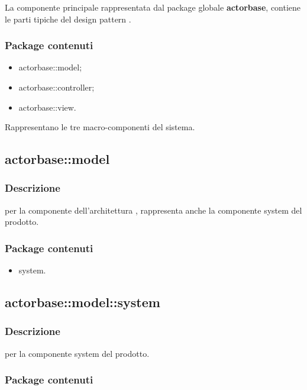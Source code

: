 \documentclass{scalatekids-article}
\begin{document}
La componente principale rappresentata dal package globale \textbf{actorbase},
contiene le parti tipiche del design pattern .

\subsubsection{Package contenuti}

\begin{itemize}
\item actorbase::model;
\item actorbase::controller;
\item actorbase::view.
\end{itemize}

Rappresentano le tre macro-componenti del sistema.

\subsection{actorbase::model}

\subsubsection{Descrizione}

 per la componente  dell'architettura , rappresenta anche la componente system del prodotto.

\subsubsection{Package contenuti}

\begin{itemize}
\item system.
\end{itemize}

\subsection{actorbase::model::system}

\subsubsection{Descrizione}

 per la componente system del prodotto.

\subsubsection{Package contenuti}
\end{document}
